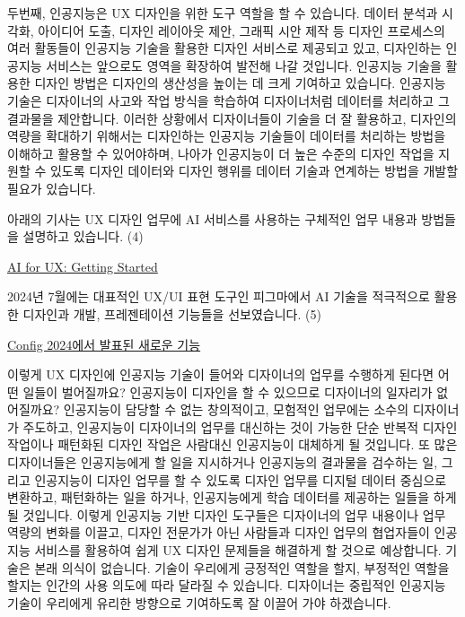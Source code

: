 \documentclass[
  letterpaper,
]{book}
\begin{document}
두번째, 인공지능은 UX 디자인을 위한 도구 역할을 할 수 있습니다. 데이터
분석과 시각화, 아이디어 도출, 디자인 레이아웃 제안, 그래픽 시안 제작 등
디자인 프로세스의 여러 활동들이 인공지능 기술을 활용한 디자인 서비스로
제공되고 있고, 디자인하는 인공지능 서비스는 앞으로도 영역을 확장하여
발전해 나갈 것입니다. 인공지능 기술을 활용한 디자인 방법은 디자인의
생산성을 높이는 데 크게 기여하고 있습니다. 인공지능 기술은 디자이너의
사고와 작업 방식을 학습하여 디자이너처럼 데이터를 처리하고 그 결과물을
제안합니다. 이러한 상황에서 디자이너들이 기술을 더 잘 활용하고, 디자인의
역량을 확대하기 위해서는 디자인하는 인공지능 기술들이 데이터를 처리하는
방법을 이해하고 활용할 수 있어야하며, 나아가 인공지능이 더 높은 수준의
디자인 작업을 지원할 수 있도록 디자인 데이터와 디자인 행위를 데이터
기술과 연계하는 방법을 개발할 필요가 있습니다.

아래의 기사는 UX 디자인 업무에 AI 서비스를 사용하는 구체적인 업무 내용과
방법들을 설명하고 있습니다. (4)

\href{https://www.nngroup.com/articles/ai-ux-getting-started/}{AI for
UX: Getting Started}

2024년 7월에는 대표적인 UX/UI 표현 도구인 피그마에서 AI 기술을
적극적으로 활용한 디자인과 개발, 프레젠테이션 기능들을 선보였습니다. (5)

\href{https://help.figma.com/hc/ko/articles/24037640924823-Config-2024에서-발표된-새로운-기능}{Config
2024에서 발표된 새로운 기능}

이렇게 UX 디자인에 인공지능 기술이 들어와 디자이너의 업무를 수행하게
된다면 어떤 일들이 벌어질까요? 인공지능이 디자인을 할 수 있으므로
디자이너의 일자리가 없어질까요? 인공지능이 담당할 수 없는 창의적이고,
모험적인 업무에는 소수의 디자이너가 주도하고, 인공지능이 디자이너의
업무를 대신하는 것이 가능한 단순 반복적 디자인 작업이나 패턴화된 디자인
작업은 사람대신 인공지능이 대체하게 될 것입니다. 또 많은 디자이너들은
인공지능에게 할 일을 지시하거나 인공지능의 결과물을 검수하는 일, 그리고
인공지능이 디자인 업무를 할 수 있도록 디자인 업무를 디지털 데이터
중심으로 변환하고, 패턴화하는 일을 하거나, 인공지능에게 학습 데이터를
제공하는 일들을 하게 될 것입니다. 이렇게 인공지능 기반 디자인 도구들은
디자이너의 업무 내용이나 업무 역량의 변화를 이끌고, 디자인 전문가가 아닌
사람들과 디자인 업무의 협업자들이 인공지능 서비스를 활용하여 쉽게 UX
디자인 문제들을 해결하게 할 것으로 예상합니다. 기술은 본래 의식이
없습니다. 기술이 우리에게 긍정적인 역할을 할지, 부정적인 역할을 할지는
인간의 사용 의도에 따라 달라질 수 있습니다. 디자이너는 중립적인 인공지능
기술이 우리에게 유리한 방향으로 기여하도록 잘 이끌어 가야 하겠습니다.
\end{document}
